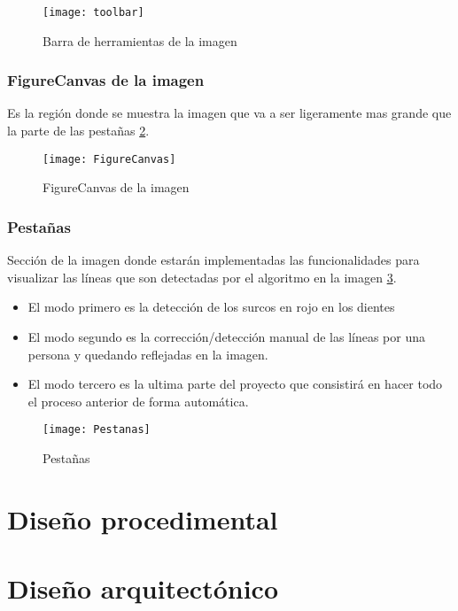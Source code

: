 \begin{figure}[h]
\centering
\texttt{[image: toolbar]}
\caption{Barra de herramientas de la imagen}\label{fig:5.11}
\end{figure}


\subsubsection{FigureCanvas de la imagen}
Es la región donde se muestra la imagen que va a ser ligeramente mas grande que la parte de las pestañas \ref{fig:5.12}.
\begin{figure}[h]
\centering
\texttt{[image: FigureCanvas]}
\caption{FigureCanvas de la imagen}
\label{fig:5.12}
\end{figure}


\subsubsection{Pestañas}
Sección de la imagen donde estarán implementadas las funcionalidades para visualizar las líneas que son detectadas por el algoritmo en la imagen \ref{fig:5.13}.
\begin{itemize}
\item El modo primero es la detección de los surcos en rojo en los dientes 
\item El modo segundo es la corrección/detección manual de las líneas por una persona y quedando reflejadas en la imagen.
\item El modo tercero es la ultima parte del proyecto que consistirá en hacer todo el proceso anterior de forma automática.
\end{itemize}

\begin{figure}[h]
\centering
\texttt{[image: Pestanas]}
\caption{Pestañas}
\label{fig:5.13}
\end{figure}

\section{Diseño procedimental}

\section{Diseño arquitectónico}
